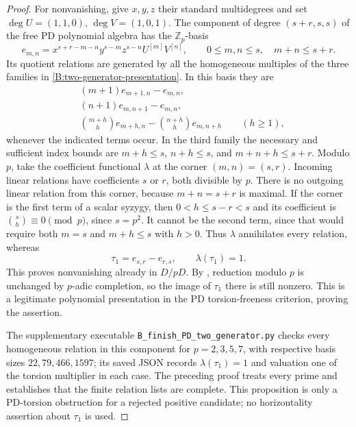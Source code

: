 \begin{proof}
For nonvanishing, give $x,y,z$ their standard multidegrees and set
$\deg U=(1,1,0)$, $\deg V=(1,0,1)$. The component of degree
$(s+r,s,s)$ of the free PD polynomial algebra has the
$\mathbb Z_p$-basis
\[
 e_{m,n}=x^{s+r-m-n}y^{s-m}z^{s-n}U^{[m]}V^{[n]},
 \qquad 0\leq m,n\leq s,\quad m+n\leq s+r.
\]
Its quotient relations are generated by all the homogeneous
multiples of the three families in
\eqref{B:two-generator-presentation}. In this basis they are
\begin{align*}
 &(m+1)e_{m+1,n}-e_{m,n},\\
 &(n+1)e_{m,n+1}-e_{m,n},\\
 &\binom{m+h}{h}e_{m+h,n}
       -\binom{n+h}{h}e_{m,n+h}\qquad(h\geq1),
\end{align*}
whenever the indicated terms occur. In the third family the
necessary and sufficient index bounds are
$m+h\leq s$, $n+h\leq s$, and $m+n+h\leq s+r$.
Modulo $p$, take the coefficient functional $\lambda$ at the
corner $(m,n)=(s,r)$. Incoming linear relations have coefficients
$s$ or $r$, both divisible by $p$. There is no outgoing linear
relation from this corner, because $m+n=s+r$ is maximal.
If the corner is the first term of a scalar syzygy, then
$0<h\leq s-r<s$ and its coefficient is
$\binom{s}{h}\equiv0\pmod p$, since $s=p^2$.
It cannot be the second term, since that would require both
$m=s$ and $m+h\leq s$ with $h>0$.
Thus $\lambda$ annihilates every relation, whereas
\[
 \tau_1=e_{s,r}-e_{r,s},\qquad \lambda(\tau_1)=1.
\]
This proves nonvanishing already in $D/pD$.
By \cite[Lemma 10.96.3, Tag 05GG]{B:StacksCompletion}, reduction
modulo $p$ is unchanged by $p$-adic completion, so the image of
$\tau_1$ there is still nonzero. This is a legitimate polynomial
presentation in the PD torsion-freeness criterion, proving the assertion.

The supplementary executable \texttt{B\_finish\_PD\_two\_generator.py}
checks every homogeneous relation in this component for $p=2,3,5,7$,
with respective basis sizes $22,79,466,1597$; its saved JSON records
$\lambda(\tau_1)=1$ and valuation one of the torsion multiplier in
each case. The preceding proof treats every prime and establishes
that the finite relation lists are complete. This proposition is
only a PD-torsion obstruction for a rejected positive candidate;
no horizontality assertion about $\tau_1$ is used.
\end{proof}
